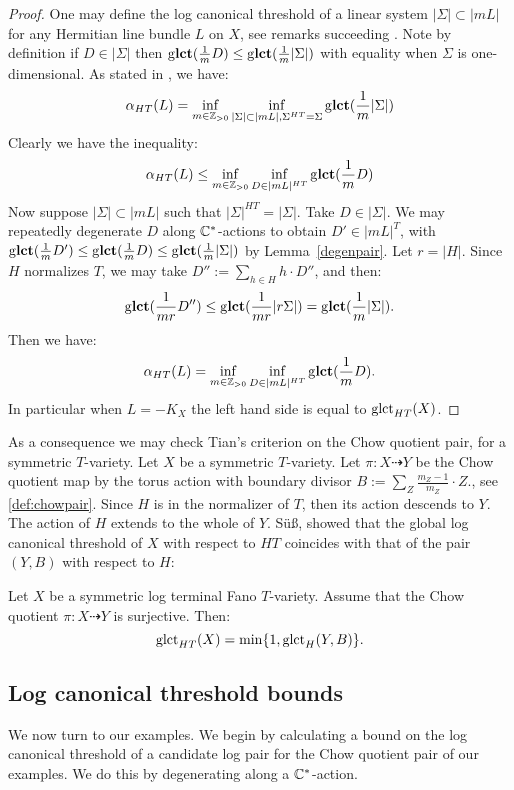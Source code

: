 \begin{proof}
One may define the log canonical threshold of a linear system \(|\Sigma| \subset |mL|\) for any Hermitian line bundle \(L\) on \(X\), see remarks succeeding \cite[Definition A.2]{cheltsov08}. Note by definition if \(D \in |\Sigma|\) then \(\operatorname{g\bf{lct}}(\frac{1}{m} D) \le \operatorname{g\bf{lct}}( \frac{1}{m} |\Sigma|)\) with equality when \(\Sigma\) is one-dimensional. As stated in \cite[(A.1)]{cheltsov08}, we have:
\[
\alpha_{HT}(L) = \inf_{m \in \mathbb{Z}_{>0}} \inf_{|\Sigma| \subset |mL|, \Sigma^{HT} = \Sigma} \operatorname{g\bf{lct}} ( \frac{1}{m} |\Sigma| ) 
\]
Clearly we have the inequality:
\[
\alpha_{HT}(L)  \le \inf_{m \in \mathbb{Z}_{>0}} \inf_{D \in |mL|^{HT}} \operatorname{g\bf{lct}} (\frac{1}{m} D) 
\]
Now suppose \(|\Sigma| \subset |mL|\) such that \(|\Sigma|^{HT} = |\Sigma|\). Take \(D \in |\Sigma|\). We may repeatedly degenerate \(D\) along \(\mathbb{C}^*\)-actions to obtain \(D' \in |mL|^{T}\), with \(\operatorname{g\bf{lct}}(\frac{1}{m}D') \le \operatorname{g\bf{lct}}(\frac{1}{m}D) \le \operatorname{g\bf{lct}}( \frac{1}{m}|\Sigma|)\) by Lemma~\ref{degenpair}. Let \(r = |H|\). Since \(H\) normalizes \(T\), we may take \(D'':= \sum_{h \in H} h \cdot D''\), and then:
\[
\operatorname{g\bf{lct}}(\frac{1}{m r }D'') \le \operatorname{g\bf{lct}}( \frac{1}{mr} | r\Sigma|) = \operatorname{g\bf{lct}}( \frac{1}{m}|\Sigma|).
\]
Then we have:
\[
\alpha_{HT}(L) = \inf_{m \in \mathbb{Z}_{>0}} \inf_{D \in |mL|^{HT}} \operatorname{g\bf{lct}} (\frac{1}{m} D).
\]
In particular when \(L = -K_X\) the left hand side is equal to \(\operatorname{glct}_{HT}(X)\).
\end{proof}
As a consequence we may check Tian's criterion on the Chow quotient pair, for a symmetric \(T\)-variety. Let \(X\) be a symmetric \(T\)-variety. Let \(\pi:X \dashrightarrow Y\) be the Chow quotient map by the torus action with boundary divisor \(B := \sum_Z \frac{m_Z-1}{m_Z} \cdot Z.\), see \ref{def:chowpair}. Since \(H\) is in the normalizer of \(T\), then its action descends to \(Y\). The action of \(H\) extends to the whole of \(Y\). S{\"u}{\ss}, showed that the global log canonical threshold of \(X\) with respect to \(HT\) coincides with that of the pair \((Y,B)\) with respect to \(H\):
\begin{theorem}[ {\cite[Theorem 1.2]{Su13}}]\label{thm:SU}
Let \(X\) be a symmetric log terminal Fano \(T\)-variety. Assume that the Chow quotient \(\pi:X \dashrightarrow Y\) is surjective. Then:
\[
\operatorname{glct}_{HT}(X) = \min \{1, \operatorname{glct}_H(Y,B) \}.
\]
\end{theorem}
%
%
%
%
%
%
%
%
%
%
%
%
%
%
%
%
%
%
\subsection{Log canonical threshold bounds}
We now turn to our examples. We begin by calculating a bound on the log canonical threshold of a candidate log pair for the Chow quotient pair of our examples. We do this by degenerating along a \(\mathbb{C}^*\)-action.

